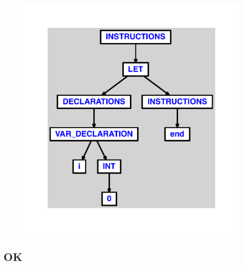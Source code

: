\documentclass{article}
\begin{document}
\begin{figure}[H]\centering\includegraphics[max width=\textwidth]{ast/ast_262.pdf}\end{figure}\subsection{OK}
\end{document}
